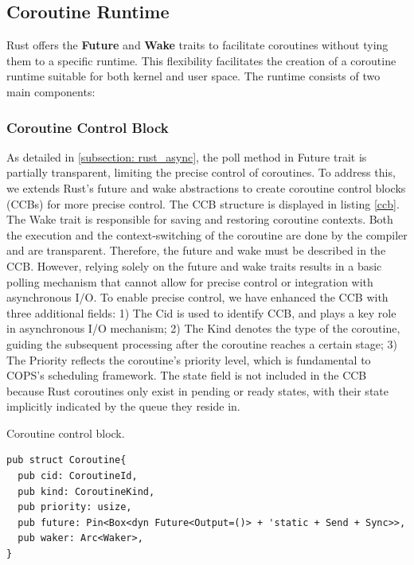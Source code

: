 \documentclass[conference]{IEEEtran}
\begin{document}
\subsection{Coroutine Runtime}
\label{section: Coroutine Runtime}

Rust offers the \textbf{Future} and \textbf{Wake} traits to facilitate coroutines without tying them to a specific runtime. This flexibility facilitates the creation of a coroutine runtime suitable for both kernel and user space. The runtime consists of two main components: 

\subsubsection{Coroutine Control Block}

As detailed in \ref{subsection: rust_async}, the poll method in Future trait is partially transparent, limiting the precise control of coroutines. To address this, we extends Rust's future and wake abstractions to create coroutine control blocks (CCBs) for more precise control. The CCB structure is displayed in listing \ref{ccb}. The Wake trait is responsible for saving and restoring coroutine contexts. Both the execution and the context-switching of the coroutine are done by the compiler and are transparent. Therefore, the future and wake must be described in the CCB. However, relying solely on the future and wake traits results in a basic polling mechanism that cannot allow for precise control or integration with asynchronous I/O. To enable precise control, we have enhanced the CCB with three additional fields: 1) The Cid is used to identify CCB, and plays a key role in asynchronous I/O mechanism; 2) The Kind denotes the type of the coroutine, guiding the subsequent processing after the coroutine reaches a certain stage; 3) The Priority reflects the coroutine's priority level, which is fundamental to COPS's scheduling framework. The state field is not included in the CCB because Rust coroutines only exist in pending or ready states, with their state implicitly indicated by the queue they reside in.


\begin{listing}
\caption{Coroutine control block.}
\label{ccb}
\begin{mdframed}
\begin{verbatim}
pub struct Coroutine{
  pub cid: CoroutineId,
  pub kind: CoroutineKind,
  pub priority: usize,
  pub future: Pin<Box<dyn Future<Output=()> + 'static + Send + Sync>>, 
  pub waker: Arc<Waker>,
}
\end{verbatim}
\end{mdframed}
\end{listing}
\end{document}
